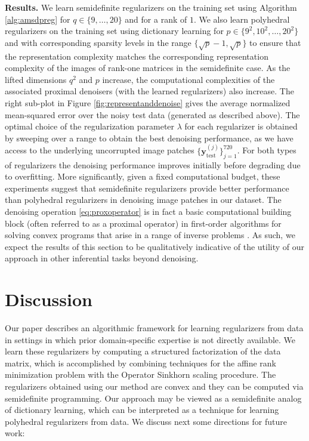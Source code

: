 \documentclass[11pt,letterpaper]{article}
\newcommand{\by}{\mathbf{y}}
\begin{document}
\textbf{Results.} We learn semidefinite regularizers on the training set using Algorithm \ref{alg:amsdpreg} for $q \in \{9, \dots,20\}$ and for a rank of $1$.  We also learn polyhedral regularizers on the training set using dictionary learning for $p \in \{9^2, 10^2, \dots, 20^2\}$ and with corresponding sparsity levels in the range $\{\sqrt{p}-1, \sqrt{p}\}$ to ensure that the representation complexity matches the corresponding representation complexity of the images of rank-one matrices in the semidefinite case.  As the lifted dimensions $q^2$ and $p$ increase, the computational complexities of the associated proximal denoisers (with the learned regularizers) also increase.  The right sub-plot in Figure \ref{fig:representanddenoise} gives the average normalized mean-squared error over the noisy test data (generated as described above).  The optimal choice of the regularization parameter $\lambda$ for each regularizer is obtained by sweeping over a range to obtain the best denoising performance, as we have access to the underlying uncorrupted image patches $\{\by^{(j)}_{\mathrm{test}}\}_{j=1}^{720}$.  For both types of regularizers the denoising performance improves initially before degrading due to overfitting.  More significantly, given a fixed computational budget, these experiments suggest that semidefinite regularizers provide better performance than polyhedral regularizers in denoising image patches in our dataset.  The denoising operation \eqref{eq:proxoperator} is in fact a basic computational building block (often referred to as a proximal operator) in first-order algorithms for solving convex programs that arise in a range of inverse problems \cite{PB:14}.  As such, we expect the results of this section to be qualitatively indicative of the utility of our approach in other inferential tasks beyond denoising.


\section{Discussion} \label{sec:discussion}
Our paper describes an algorithmic framework for learning regularizers from data in settings in which prior domain-specific expertise is not directly available.  We learn these regularizers by computing a structured factorization of the data matrix, which is accomplished by combining techniques for the affine rank minimization problem with the Operator Sinkhorn scaling procedure.  The regularizers obtained using our method are convex and they can be computed via semidefinite programming.  Our approach may be viewed as a semidefinite analog of dictionary learning, which can be interpreted as a technique for learning polyhedral regularizers from data.  We discuss next some directions for future work:
\end{document}
